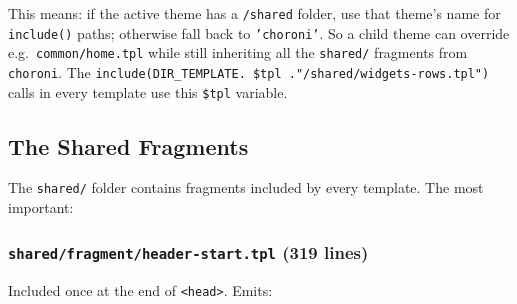 \documentclass[11pt,a4paper]{article}
\begin{document}
This means: if the active theme has a \texttt{/shared} folder, use
that theme's name for \texttt{include()} paths; otherwise fall back
to \texttt{'choroni'}. So a child theme can override e.g.\
\texttt{common/home.tpl} while still inheriting all the
\texttt{shared/} fragments from \texttt{choroni}. The
\texttt{include(DIR\_TEMPLATE. \$tpl ."/shared/widgets-rows.tpl")}
calls in every template use this \texttt{\$tpl} variable.

\subsection{The Shared Fragments}

The \texttt{shared/} folder contains fragments included by every
template. The most important:

\subsubsection{\texttt{shared/fragment/header-start.tpl} (319 lines)}

Included once at the end of \texttt{<head>}. Emits:
\end{document}
